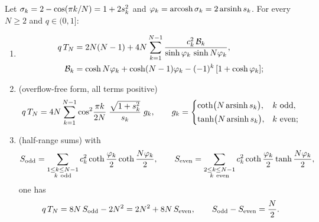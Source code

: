 \begin{theorem}[Single sums for opposite corners, $\dd=2$]\label{s4_mfpt:thm-single}
Let $\sigma_{k}=2-\cos(\pi k/N)=1+2s_{k}^{2}$ and $\varphi_{k}=\operatorname{arcosh}\sigma_{k}=2\operatorname{arsinh}s_{k}$.
For every $N\ge2$ and $q\in(0,1]$:
\begin{enumerate}
\item[(a)]
\begin{equation}\label{s4_mfpt:eq-single-a}
\begin{aligned}
  q\,T_{N}&=2N(N-1)+4N\sum_{k=1}^{N-1}\frac{c_{k}^{2}\,\mathcal{B}_{k}}{\sinh\varphi_{k}\,\sinh N\varphi_{k}},\\
  \mathcal{B}_{k}&=\cosh N\varphi_{k}+\cosh (N-1)\varphi_{k}-(-1)^{k}\,[1+\cosh\varphi_{k}];
\end{aligned}
\end{equation}
\item[(b)] (overflow-free form, all terms positive)
\begin{equation}\label{s4_mfpt:eq-single-S}
  q\,\TN=4N\sum_{k=1}^{N-1}\cos^{2}\!\frac{\pi k}{2N}\;\frac{\sqrt{1+\sk{k}^{2}}}{\sk{k}}\;g_k,\qquad
  g_k=\begin{cases}\coth\bigl(N\arsinh \sk{k}\bigr), & k\ \text{odd},\\[2pt]
                   \tanh\bigl(N\arsinh \sk{k}\bigr), & k\ \text{even};\end{cases}
\end{equation}
\item[(c)] (half-range sums) with
\begin{equation}\label{s4_mfpt:eq-half-def}
  S_{\mathrm{odd}}=\sum_{\substack{1\le k\le N-1\\ k\ \mathrm{odd}}}\ck{k}^{2}\coth\frac{\phk{k}}{2}\coth\frac{N\phk{k}}{2},
  \qquad
  S_{\mathrm{even}}=\sum_{\substack{2\le k\le N-1\\ k\ \mathrm{even}}}\ck{k}^{2}\coth\frac{\phk{k}}{2}\tanh\frac{N\phk{k}}{2},
\end{equation}
one has
\begin{equation}\label{s4_mfpt:eq-half}
  q\,T_{N}=8N\,S_{\mathrm{odd}}-2N^{2}=2N^{2}+8N\,S_{\mathrm{even}},\qquad S_{\mathrm{odd}}-S_{\mathrm{even}}=\frac N2 .
\end{equation}
\end{enumerate}
\end{theorem}

